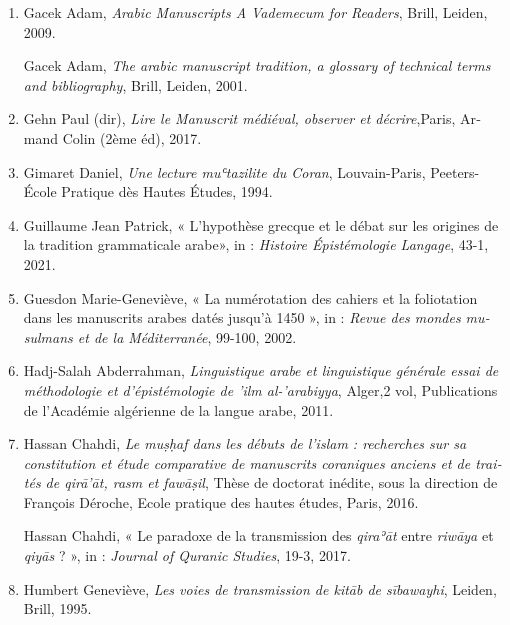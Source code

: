 \documentclass[a4paper,12pt]{report}
\begin{document}
\begin{french}
\begin{enumerate} [III]
\begin{enumerate}
  \textemdash\textemdash  Fleisch Henri, \textit{Traité de  philologie arabe}, vol. II, Beyrouth, Dar El-Machreq,  2008.

\item Gacek Adam, \textit{Arabic Manuscripts A Vademecum for Readers}, Brill, Leiden, 2009.

\textemdash  \textemdash Gacek Adam, \textit{The arabic manuscript tradition, a glossary of technical terms and bibliography}, Brill, Leiden, 2001. 

\item 	Gehn Paul (dir), \textit{Lire le Manuscrit médiéval, observer et décrire},Paris,  Armand Colin (2ème éd), 2017. 

    \item Gimaret Daniel, \textit{Une lecture muʿtazilite du Coran}, Louvain-Paris, Peeters-École Pratique dès Hautes Études, 1994.
    
\item Guillaume Jean Patrick, « L'hypothèse grecque et le débat sur les origines de la tradition grammaticale arabe», in :\textit{ Histoire Épistémologie Langage}, 43-1, 2021.






\item 	Guesdon Marie-Geneviève, « La numérotation des cahiers et la foliotation dans les manuscrits arabes datés jusqu’à 1450 », in : \textit{Revue des mondes musulmans et de la Méditerranée}, 99-100, 2002.


    \item Hadj-Salah Abderrahman, \textit{Linguistique arabe et linguistique générale essai de méthodologie et d'épistémologie de 'ilm al-'arabiyya}, Alger,2 vol, Publications de l'Académie algérienne de la langue arabe, 2011.
\item 	 Hassan Chahdi, \textit{Le muṣḥaf dans les débuts de l'islam : recherches sur sa constitution et étude comparative de manuscrits coraniques anciens et de traités de qirā'āt, rasm et fawāṣil}, Thèse de doctorat inédite, sous la direction de François Déroche, Ecole pratique des hautes études, Paris, 2016. 

\textemdash \textemdash  Hassan Chahdi,  « Le paradoxe de la transmission des \textit{qiraʾāt} entre \textit{riwāya} et \textit{qiyās} ? », in :\textit{ Journal of Quranic Studies},  19-3, 2017.

        \item Humbert Geneviève, \textit{Les voies de transmission de kitāb de sībawayhi}, Leiden, Brill, 1995.
        

\end{enumerate}
\end{enumerate}
\end{french}
\end{document}
